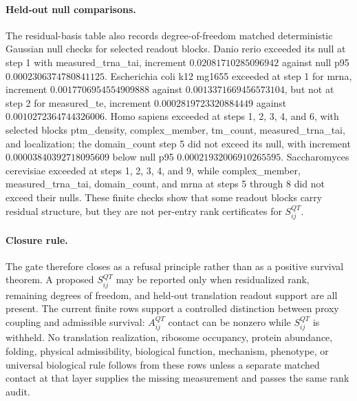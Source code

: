 \paragraph{Held-out null comparisons.}
The residual-basis table also records degree-of-freedom matched deterministic Gaussian null checks for selected readout blocks.  Danio rerio exceeded its null at step 1 with measured\_trna\_tai, increment $0.02081710285096942$ against null p95 $0.0002306374780841125$.  Escherichia coli k12 mg1655 exceeded at step 1 for mrna, increment $0.0017706954554909888$ against $0.0013371669456573104$, but not at step 2 for measured\_te, increment $0.0002819723320884449$ against $0.0010272364744326006$.  Homo sapiens exceeded at steps 1, 2, 3, 4, and 6, with selected blocks ptm\_density, complex\_member, tm\_count, measured\_trna\_tai, and localization; the domain\_count step 5 did not exceed its null, with increment $0.00003840392718095609$ below null p95 $0.00021932006910265595$.  Saccharomyces cerevisiae exceeded at steps 1, 2, 3, 4, and 9, while complex\_member, measured\_trna\_tai, domain\_count, and mrna at steps 5 through 8 did not exceed their nulls.  These finite checks show that some readout blocks carry residual structure, but they are not per-entry rank certificates for $S^{QT}_{ij}$.

\paragraph{Closure rule.}
The gate therefore closes as a refusal principle rather than as a positive survival theorem.  A proposed $S^{QT}_{ij}$ may be reported only when residualized rank, remaining degrees of freedom, and held-out translation readout support are all present.  The current finite rows support a controlled distinction between proxy coupling and admissible survival: $A^{QT}_{ij}$ contact can be nonzero while $S^{QT}_{ij}$ is withheld.  No translation realization, ribosome occupancy, protein abundance, folding, physical admissibility, biological function, mechanism, phenotype, or universal biological rule follows from these rows unless a separate matched contact at that layer supplies the missing measurement and passes the same rank audit.

